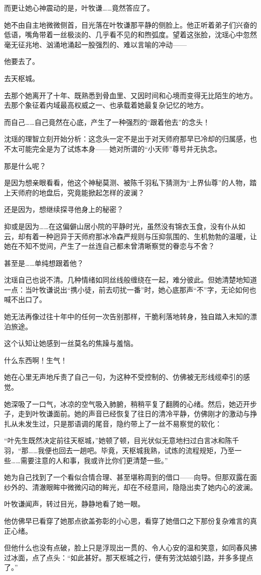 而更让她心神震动的是，叶牧谦……竟然答应了。

她不由自主地微微侧首，目光落在叶牧谦那平静的侧脸上。他正听着弟子们兴奋的低语，嘴角带着一丝极淡的、几乎看不见的和煦弧度。望着这张脸，沈瑶心中忽然毫无征兆地、汹涌地涌起一股强烈的、难以言喻的冲动——

他要去了。

去天枢城。

去那个她离开了十年、既熟悉到骨血里、又因时间和心境而变得无比陌生的地方。去那个象征着内域最高权威之一、也承载着她最复杂记忆的地方。

而自己……自己竟然在心底，产生了一种强烈的“跟着他去”的念头！

沈瑶的理智立刻开始分析：这念头一定不是出于对天师府那早已冷却的归属感，也不太可能完全是为了试炼本身——她对所谓的“小天师”尊号并无执念。

那是什么呢？

是因为想亲眼看看，他这个神秘莫测、被陈千羽私下猜测为“上界仙尊”的人物，踏上天师府的地盘后，究竟能掀起怎样的波澜？

还是因为，想继续探寻他身上的秘密？

抑或是因为……在这偏僻山居小院的平静时光，虽然没有锦衣玉食，没有仆从如云，却有着一种迥异于天师府那冰冷森严规则与压抑氛围的、生机勃勃的温暖，让她在不知不觉间，产生了一丝连自己都未曾清晰察觉的眷恋与不舍？

甚至是……单纯想跟着他？

沈瑶自己也说不清。几种情绪如同丝线般缠绕在一起，难分彼此。但她清楚地知道一点：当叶牧谦说出“携小徒，前去叨扰一番”时，她心底那声“不”字，无论如何也喊不出口了。

她无法再像过往十年中的任何一次告别那样，干脆利落地转身，独自踏入未知的漂泊旅途。

这个认知让她感到一丝莫名的焦躁与羞恼。

什么东西啊！生气！

她在心里无声地斥责了自己一句，为这种不受控制的、仿佛被无形线缆牵引的感觉。

她深吸了一口气，冰凉的空气吸入肺腑，稍稍平复了翻腾的心绪。然后，她迈开步子，走到叶牧谦面前。她的声音已经恢复了往日的清冷平静，仿佛刚才的激动与挣扎从未发生过，只是那语调的尾音，隐约带上了一丝不易察觉的软化：

“叶先生既然决定前往天枢城，”她顿了顿，目光状似无意地扫过白言冰和陈千羽，“那……我便也回去一趟吧。毕竟，天枢城我熟，试炼的流程规矩，乃至一些……需要注意的人和事，我或许比你们更清楚一些。”

她为自己找到了一个看似合情合理、甚至堪称周到的借口——向导。但那双露在面纱外的、清澈眼眸中微微闪动的眸光，却在不经意间，隐隐出卖了她内心的波澜。

叶牧谦闻声，转过目光，静静地看了她一眼。

他仿佛早已看穿了她那点欲盖弥彰的小心思，看穿了她借口之下那份复杂难言的真正心绪。

但他什么也没有点破，脸上只是浮现出一贯的、令人心安的温和笑意，如同春风拂过冰面，点了点头：“如此甚好。那天枢城之行，便有劳沈姑娘引路，并多多提点了。”

